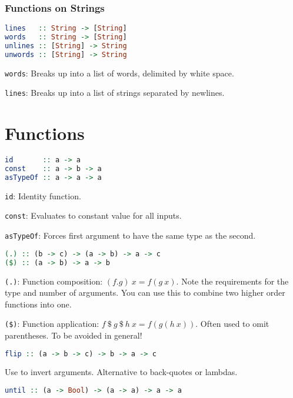 \documentclass[twocolumn,english]{article}
\begin{document}
\subsubsection{Functions on Strings}

\begin{lstlisting}[language=Haskell,frame=single]
lines   :: String -> [String]
words   :: String -> [String]
unlines :: [String] -> String
unwords :: [String] -> String
\end{lstlisting}


\texttt{words}: Breaks up into a list of words, delimited by white
space.

\texttt{lines}: Breaks up into a list of strings separated by newlines.


\section{Functions}

\begin{lstlisting}[language=Haskell,frame=single]
id       :: a -> a
const    :: a -> b -> a
asTypeOf :: a -> a -> a
\end{lstlisting}


\texttt{id}: Identity function.

\texttt{const}: Evaluates to constant value for all inputs.

\texttt{asTypeOf}: Forces first argument to have the same type as
the second.

\begin{lstlisting}[language=Haskell,frame=single]
(.) :: (b -> c) -> (a -> b) -> a -> c
($) :: (a -> b) -> a -> b
\end{lstlisting}


\texttt{(.)}: Function composition: $(f.g)\:x=f(g\:x)$. Note the
requirements for the type and number of arguments. You can use this
to combine two higher order functions into one.

\texttt{(\$)}: Function application: $f\:\$\:g\:\$\:h\:x=f(g(h\:x))$.
Often used to omit parentheses. To be avoided in general!

\begin{lstlisting}[language=Haskell,frame=single]
flip :: (a -> b -> c) -> b -> a -> c
\end{lstlisting}


Use to invert arguments. Alternative to back-quotes or lambdas.

\begin{lstlisting}[language=Haskell,frame=single]
until :: (a -> Bool) -> (a -> a) -> a -> a
\end{lstlisting}
\end{document}
